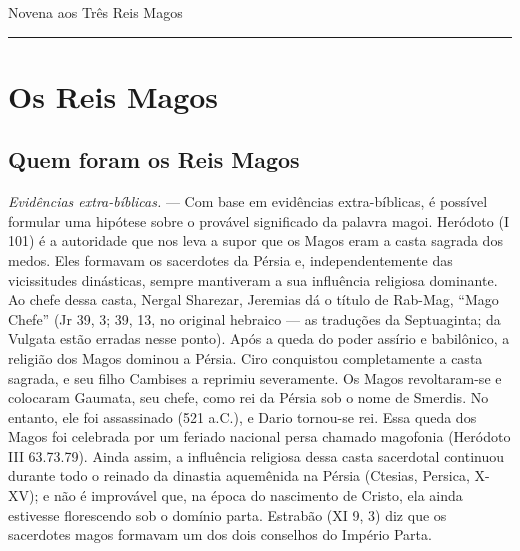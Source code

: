 \documentclass[a4paper,14pt]{extarticle} \usepackage[utf8]{inputenc}
\begin{document}



\begin{center}
  {\huge Novena aos Três Reis Magos}
\end{center}





\noindent\rule{\textwidth}{0.4pt}
\tableofcontents
\thispagestyle{empty}

\newpage

\newpage

\section{Os Reis Magos}
\subsection*{Quem foram os Reis Magos}

\textit{Evidências extra-bíblicas.} — Com base em evidências extra-bíblicas, é possível formular uma hipótese sobre o provável significado da palavra magoi. Heródoto (I 101) é a autoridade que nos leva a supor que os Magos eram a casta sagrada dos medos. Eles formavam os sacerdotes da Pérsia e, independentemente das vicissitudes dinásticas, sempre mantiveram a sua influência religiosa dominante. Ao chefe dessa casta, Nergal Sharezar, Jeremias dá o título de Rab-Mag, “Mago Chefe” (Jr 39, 3; 39, 13, no original hebraico — as traduções da Septuaginta; da Vulgata estão erradas nesse ponto). Após a queda do poder assírio e babilônico, a religião dos Magos dominou a Pérsia. Ciro conquistou completamente a casta sagrada, e seu filho Cambises a reprimiu severamente. Os Magos revoltaram-se e colocaram Gaumata, seu chefe, como rei da Pérsia sob o nome de Smerdis. No entanto, ele foi assassinado (521 a.C.), e Dario tornou-se rei. Essa queda dos Magos foi celebrada por um feriado nacional persa chamado magofonia (Heródoto III 63.73.79). Ainda assim, a influência religiosa dessa casta sacerdotal continuou durante todo o reinado da dinastia aquemênida na Pérsia (Ctesias, Persica, X-XV); e não é improvável que, na época do nascimento de Cristo, ela ainda estivesse florescendo sob o domínio parta. Estrabão (XI 9, 3) diz que os sacerdotes magos formavam um dos dois conselhos do Império Parta.
\end{document}
